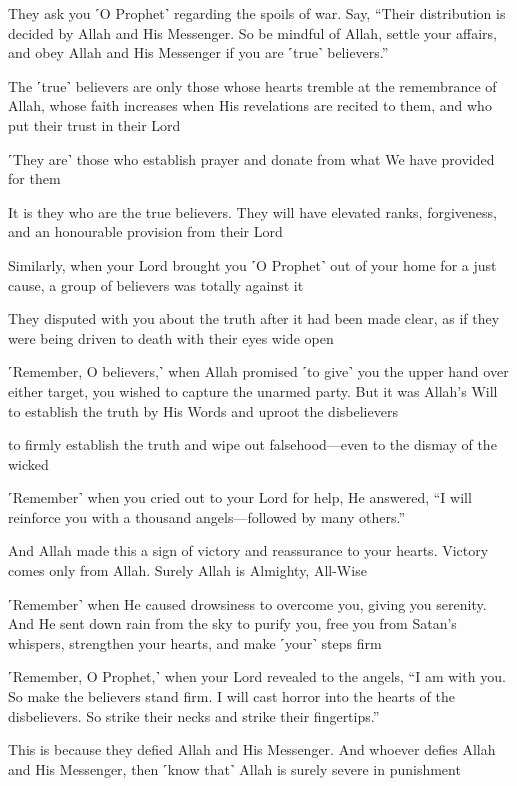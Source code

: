 They ask you ˹O Prophet˺ regarding the spoils of war. Say, “Their distribution is decided by Allah and His Messenger. So be mindful of Allah, settle your affairs, and obey Allah and His Messenger if you are ˹true˺ believers.”

The ˹true˺ believers are only those whose hearts tremble at the remembrance of Allah, whose faith increases when His revelations are recited to them, and who put their trust in their Lord

˹They are˺ those who establish prayer and donate from what We have provided for them

It is they who are the true believers. They will have elevated ranks, forgiveness, and an honourable provision from their Lord

Similarly, when your Lord brought you ˹O Prophet˺ out of your home for a just cause, a group of believers was totally against it

They disputed with you about the truth after it had been made clear, as if they were being driven to death with their eyes wide open

˹Remember, O believers,˺ when Allah promised ˹to give˺ you the upper hand over either target, you wished to capture the unarmed party. But it was Allah’s Will to establish the truth by His Words and uproot the disbelievers

to firmly establish the truth and wipe out falsehood—even to the dismay of the wicked

˹Remember˺ when you cried out to your Lord for help, He answered, “I will reinforce you with a thousand angels—followed by many others.”

And Allah made this a sign of victory and reassurance to your hearts. Victory comes only from Allah. Surely Allah is Almighty, All-Wise

˹Remember˺ when He caused drowsiness to overcome you, giving you serenity. And He sent down rain from the sky to purify you, free you from Satan’s whispers, strengthen your hearts, and make ˹your˺ steps firm

˹Remember, O Prophet,˺ when your Lord revealed to the angels, “I am with you. So make the believers stand firm. I will cast horror into the hearts of the disbelievers. So strike their necks and strike their fingertips.”

This is because they defied Allah and His Messenger. And whoever defies Allah and His Messenger, then ˹know that˺ Allah is surely severe in punishment

